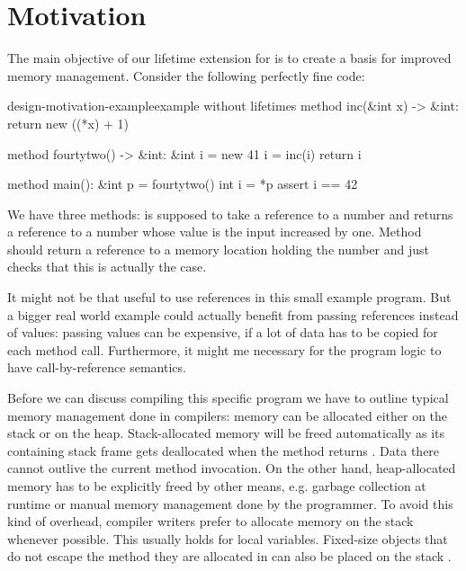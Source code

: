 \section{Motivation}\label{section:motivation}
The main objective of our lifetime extension for \whiley is to create a basis for improved memory management.
Consider the following perfectly fine \whiley code:

\begin{whileycodec}{design-motivation-example}{\whiley example without lifetimes}
method inc(&int x) -> &int:
	return new ((*x) + 1)

method fourtytwo() -> &int:
	&int i = new 41
	i = inc(i)
	return i

method main():
	&int p = fourtytwo()
	int i = *p
	assert i == 42
\end{whileycodec}

We have three methods:  is supposed to take a reference to a number and returns a reference to a number whose value is the input increased by one.
Method  should return a reference to a memory location holding the number  and  just checks that this is actually the case.

It might not be that useful to use references in this small example program.
But a bigger real world example could actually benefit from passing references instead of values:
passing values can be expensive, if a lot of data has to be copied for each method call.
Furthermore, it might me necessary for the program logic to have call-by-reference semantics.

Before we can discuss compiling this specific program we have to outline typical memory management done in compilers: memory can be allocated either on the stack or on the heap.
Stack-allocated memory will be freed automatically as its containing stack frame gets deallocated when the method returns \cite{DBLP:books/daglib/0030106}.
Data there cannot outlive the current method invocation.
On the other hand, heap-allocated memory has to be explicitly freed by other means, e.g. garbage collection at runtime or manual memory management done by the programmer.
To avoid this kind of overhead, compiler writers prefer to allocate memory on the stack whenever possible.
This usually holds for local variables.
Fixed-size objects that do not escape the method they are allocated in can also be placed on the stack \cite{Choi:1999:EAJ:320384.320386}.


